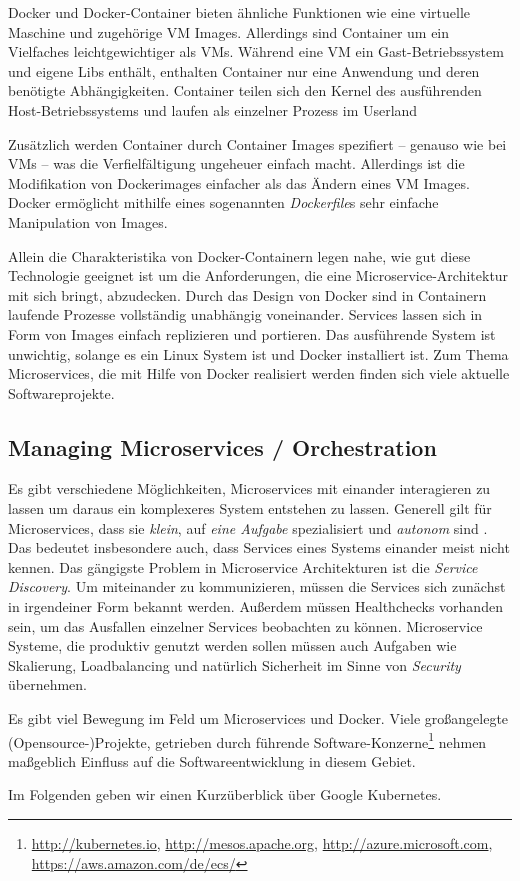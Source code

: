 Docker und Docker-Container bieten ähnliche Funktionen wie eine virtuelle Maschine und zugehörige VM Images. Allerdings sind Container um ein Vielfaches leichtgewichtiger als VMs. Während eine VM ein Gast-Betriebssystem und eigene Libs enthält, enthalten Container nur eine Anwendung und deren benötigte Abhängigkeiten. Container teilen sich den Kernel des ausführenden Host-Betriebssystems und laufen als einzelner Prozess im Userland \cite{newman2015}

Zusätzlich werden Container durch Container Images spezifiert -- genauso wie bei VMs -- was die Verfielfältigung ungeheuer einfach macht. Allerdings ist die Modifikation von Dockerimages einfacher als das Ändern eines VM Images. Docker ermöglicht mithilfe eines sogenannten \textit{Dockerfile}s sehr einfache Manipulation von Images.

Allein die Charakteristika von Docker-Containern legen nahe, wie gut diese Technologie geeignet ist um die Anforderungen, die eine Microservice-Architektur mit sich bringt, abzudecken. Durch das Design von Docker sind in Containern laufende Prozesse vollständig unabhängig voneinander. Services lassen sich in Form von Images einfach replizieren und portieren. Das ausführende System ist unwichtig, solange es ein Linux System ist und Docker installiert ist. Zum Thema Microservices, die mit Hilfe von Docker realisiert werden finden sich viele aktuelle Softwareprojekte.

\subsection{Managing Microservices / \glqq Orchestration\grqq}

Es gibt verschiedene Möglichkeiten, Microservices mit einander interagieren zu lassen um daraus ein komplexeres System entstehen zu lassen. Generell gilt für Microservices, dass sie \textit{klein}, auf \textit{eine Aufgabe} spezialisiert und \textit{autonom} sind \cite{newman2015}. Das bedeutet insbesondere auch, dass Services eines Systems einander meist nicht kennen. Das gängigste Problem in Microservice Architekturen ist die \textit{Service Discovery}. Um miteinander zu kommunizieren, müssen die Services sich zunächst in irgendeiner Form bekannt werden. Außerdem müssen Healthchecks vorhanden sein, um das Ausfallen einzelner Services beobachten zu können. Microservice Systeme, die produktiv genutzt werden sollen müssen auch Aufgaben wie Skalierung, Loadbalancing und natürlich Sicherheit im Sinne von \textit{Security} übernehmen. 

Es gibt viel Bewegung im Feld um Microservices und Docker. Viele großangelegte (Opensource-)Projekte, getrieben durch führende Software-Konzerne\footnote{\url{http://kubernetes.io}, \url{http://mesos.apache.org}, \url{http://azure.microsoft.com}, \url{https://aws.amazon.com/de/ecs/}} nehmen maßgeblich Einfluss auf die Softwareentwicklung in diesem Gebiet. 

Im Folgenden geben wir einen Kurzüberblick über Google Kubernetes. 